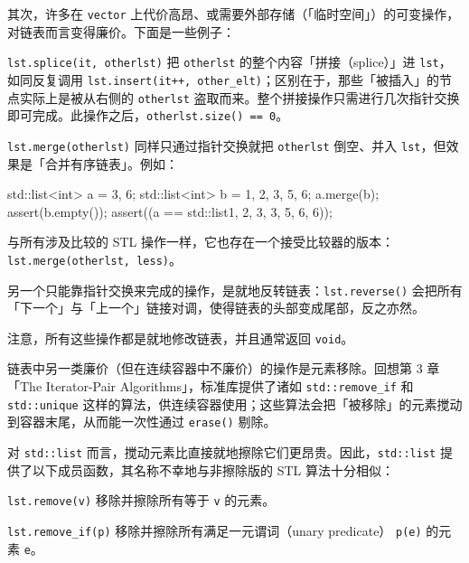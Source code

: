 其次，许多在 \texttt{vector} 上代价高昂、或需要外部存储（「临时空间」）的可变操作，对链表而言变得廉价。下面是一些例子：

\texttt{lst.\allowbreak{}splice(\allowbreak{}it,\allowbreak{} otherlst)\allowbreak{}} 把 \texttt{otherlst} 的整个内容「拼接（splice）」进 \texttt{lst}，如同反复调用 \texttt{lst.\allowbreak{}insert(\allowbreak{}it++,\allowbreak{} other\_\allowbreak{}elt)\allowbreak{}}；区别在于，那些「被插入」的节点实际上是被从右侧的 \texttt{otherlst} 盗取而来。整个拼接操作只需进行几次指针交换即可完成。此操作之后，\texttt{otherlst.\allowbreak{}size(\allowbreak{})\allowbreak{} == 0}。

\texttt{lst.\allowbreak{}merge(\allowbreak{}otherlst)\allowbreak{}} 同样只通过指针交换就把 \texttt{otherlst} 倒空、并入 \texttt{lst}，但效果是「合并有序链表」。例如：

\begin{codebox}[cpp]
    std::list<int> a = {3, 6};
    std::list<int> b = {1, 2, 3, 5, 6};
    a.merge(b);
    assert(b.empty());
    assert((a == std::list{1, 2, 3, 3, 5, 6, 6}));
\end{codebox}

与所有涉及比较的 STL 操作一样，它也存在一个接受比较器的版本：\texttt{lst.\allowbreak{}merge(\allowbreak{}otherlst,\allowbreak{} less)\allowbreak{}}。

另一个只能靠指针交换来完成的操作，是就地反转链表：\texttt{lst.\allowbreak{}reverse(\allowbreak{})\allowbreak{}} 会把所有「下一个」与「上一个」链接对调，使得链表的头部变成尾部，反之亦然。

注意，所有这些操作都是就地修改链表，并且通常返回 \texttt{void}。

链表中另一类廉价（但在连续容器中不廉价）的操作是元素移除。回想第 3 章「The Iterator-Pair Algorithms」，标准库提供了诸如 \texttt{std::\allowbreak{}remove\_\allowbreak{}if} 和 \texttt{std::\allowbreak{}unique} 这样的算法，供连续容器使用；这些算法会把「被移除」的元素搅动到容器末尾，从而能一次性通过 \texttt{erase(\allowbreak{})\allowbreak{}} 剔除。

对 \texttt{std::\allowbreak{}list} 而言，搅动元素比直接就地擦除它们更昂贵。因此，\texttt{std::\allowbreak{}list} 提供了以下成员函数，其名称不幸地与非擦除版的 STL 算法十分相似：

\texttt{lst.\allowbreak{}remove(\allowbreak{}v)\allowbreak{}} 移除并擦除所有等于 \texttt{v} 的元素。

\texttt{lst.\allowbreak{}remove\_\allowbreak{}if(\allowbreak{}p)\allowbreak{}} 移除并擦除所有满足一元谓词（unary predicate） \texttt{p(\allowbreak{}e)\allowbreak{}} 的元素 \texttt{e}。

